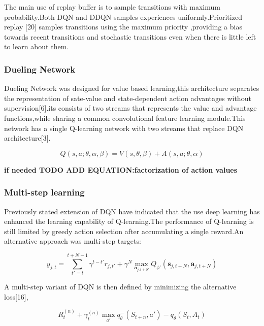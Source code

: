 The main use of replay buffer is to sample transitions with maximum probability.Both DQN and DDQN samples experiences uniformly.Prioritized replay [20] samples transitions using the maximum priority ,providing a bias towards recent transitions and stochastic transitions  even when there is little left to learn about them.

\subsubsection{Dueling Network}

Dueling Network was designed for  value based learning,this architecture separates the representation of sate-value and state-dependent action advantages without supervision[6].its consists of two streams that represents the value and advantage functions,while sharing a common convolutional feature learning module.This network has a single Q-learning network with two streams that replace DQN architecture[3]. 

\begin{equation}
    Q(s,a; \theta,\alpha,\beta) = V(s,\theta,\beta) + A(s,a; \theta,\alpha)
\end{equation}

\textbf{if needed TODO ADD EQUATION:factorization of action values}

\subsubsection{Multi-step learning}

Previously stated extension of DQN have indicated that the use deep learning has enhanced the learning capability of Q-learning.The performance of  Q-learning is still limited by greedy action selection after accumulating a single reward.An alternative approach was multi-step targets:
 
 \begin{equation}
		y_{j,t} = \sum_{t'=t}^{t+N-1} \gamma^{t-t'}    r_{j,t'} + \gamma^N  \max_{\bm{a}_{j,t+N}}Q_{\phi'}(\bm{s}_{j,t+N}, \bm{a}_{j,t+N}) 
\end{equation}

A multi-step variant of DQN is then defined by minimizing
the alternative loss[16],

\begin{equation}
	    R_t^{(n)} +  \gamma_t^{(n)}  \max_{a'} q_\theta^{-}(S_{t+n},a') - q_{\theta}(S_t,A_t)
\end{equation}
  

